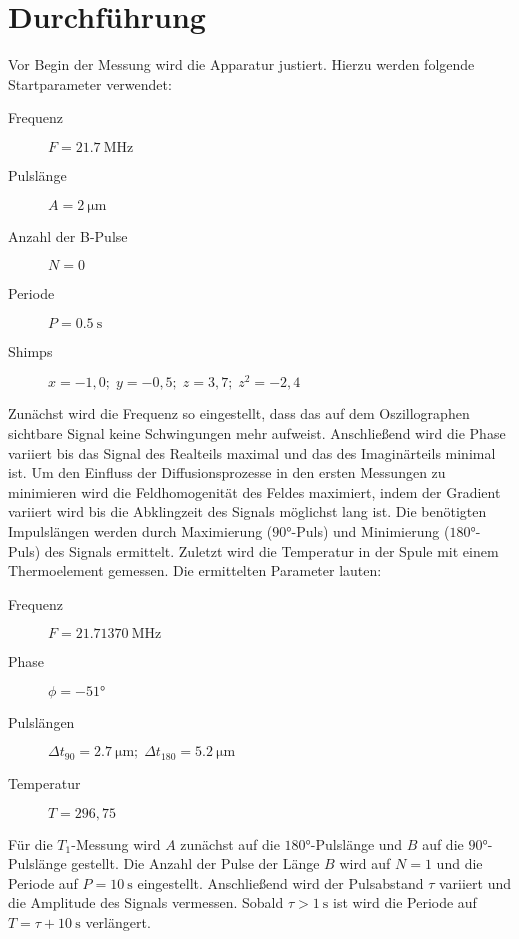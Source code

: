 \section{Durchführung}
Vor Begin der Messung wird die Apparatur justiert.
Hierzu werden folgende Startparameter verwendet:
\begin{addmargin}[10pt]{0pt}
\begin{description}
    \item[Frequenz] $F=\SI{21,7}{\MHz}$
    \item[Pulslänge] $A=\SI{2}{\micro\m}$
    \item[Anzahl der B-Pulse] $N=0$
    \item[Periode] $P=\SI{0,5}{\s}$
    \item[Shimps] $x=-1,0;\; y=-0,5;\; z=3,7;\; z^2=-2,4$    
\end{description}
\end{addmargin}
Zunächst wird die Frequenz so eingestellt, dass das auf dem Oszillographen sichtbare Signal keine Schwingungen mehr aufweist.
Anschließend wird die Phase variiert bis das Signal des Realteils maximal und das des Imaginärteils minimal ist.
Um den Einfluss der Diffusionsprozesse in den ersten Messungen zu minimieren wird die Feldhomogenität des Feldes maximiert, indem der Gradient variiert wird bis die Abklingzeit des Signals möglichst lang ist.
Die benötigten Impulslängen werden durch Maximierung ($90°$-Puls) und Minimierung ($180°$-Puls) des Signals ermittelt.
Zuletzt wird die Temperatur in der Spule mit einem Thermoelement gemessen.
Die ermittelten Parameter lauten:
\begin{addmargin}[10pt]{0pt}
\begin{description}
    \item[Frequenz] $F=\SI{21,71370}{\MHz}$
    \item[Phase] $\phi = -51°$ 
    \item[Pulslängen] $\Delta t_{90}=\SI{2,7}{\micro\m}; \; \Delta t_{180}=\SI{5,2}{\micro\m}$
    \item[Temperatur] $T=296,75$    
\end{description}
\end{addmargin}

Für die $T_1$-Messung wird $A$ zunächst auf die $180°$-Pulslänge und $B$ auf die $90°$-Pulslänge gestellt.
Die Anzahl der Pulse der Länge $B$ wird auf $N=1$ und die Periode auf $P=\SI{10}{\s}$ eingestellt.
Anschließend wird der Pulsabstand $\tau$ variiert und die Amplitude des Signals vermessen.
Sobald $\tau > \SI{1}{\s}$ ist wird die Periode auf $T=\tau+\SI{10}{\s}$ verlängert.

